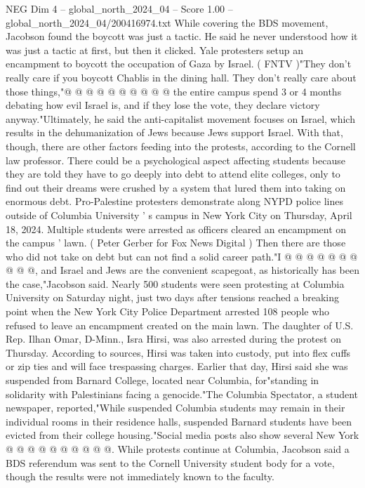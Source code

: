 \begin{textsample}{NEG Dim 4 – global\_north\_2024\_04 – Score 1.00 – global\_north\_2024\_04/200416974.txt}
While covering the BDS movement, Jacobson found the boycott was just a tactic.
He said he never understood how it was just a tactic at first, but then it clicked.
Yale protesters setup an encampment to boycott the occupation of Gaza by Israel. ( FNTV )"They don't really care if you boycott Chablis in the dining hall.
They don't really care about those things,"@ @ @ @ @ @ @ @ @ @ the entire campus spend 3 or 4 months debating how evil Israel is, and if they lose the vote, they declare victory anyway."Ultimately, he said the anti-capitalist movement focuses on Israel, which results in the dehumanization of Jews because Jews support Israel.
With that, though, there are other factors feeding into the protests, according to the Cornell law professor.
There could be a psychological aspect affecting students because they are told they have to go deeply into debt to attend elite colleges, only to find out their dreams were crushed by a system that lured them into taking on enormous debt.
Pro-Palestine protesters demonstrate along NYPD police lines outside of Columbia University ' s campus in New York City on Thursday, April 18, 2024.
Multiple students were arrested as officers cleared an encampment on the campus ' lawn. ( Peter Gerber for Fox News Digital ) Then there are those who did not take on debt but can not find a solid career path."I @ @ @ @ @ @ @ @ @ @, and Israel and Jews are the convenient scapegoat, as historically has been the case,"Jacobson said.
Nearly 500 students were seen protesting at Columbia University on Saturday night, just two days after tensions reached a breaking point when the New York City Police Department arrested 108 people who refused to leave an encampment created on the main lawn.
The daughter of U.S.
Rep.
Ilhan Omar, D-Minn., Isra Hirsi, was also arrested during the protest on Thursday.
According to sources, Hirsi was taken into custody, put into flex cuffs or zip ties and will face trespassing charges.
Earlier that day, Hirsi said she was suspended from Barnard College, located near Columbia, for"standing in solidarity with Palestinians facing a genocide."The Columbia Spectator, a student newspaper, reported,"While suspended Columbia students may remain in their individual rooms in their residence halls, suspended Barnard students have been evicted from their college housing."Social media posts also show several New York @ @ @ @ @ @ @ @ @ @.
While protests continue at Columbia, Jacobson said a BDS referendum was sent to the Cornell University student body for a vote, though the results were not immediately known to the faculty.

\end{textsample}
